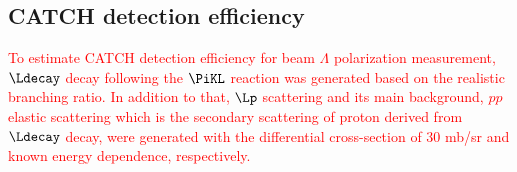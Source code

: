 \begin{comment}
\subsubsection{BGO energy measurement efficiency }
The efficiency was estimated by checking whether or not the measured energy by BGO was consistent with the predicted energy from the pp scattering kinematics, using the $pp$ elastic scattering data the same way as in the study of CFT tracking efficiency. Figure \ref{fig-BGOeff}  shows the momentum dependence of the
BGO efficiency for protons emitted at $\theta_{lab}=41^{\circ}$ where the crossed line represents the simulation result and the red circle represents the result of $pp$ elastic scattering data. Regarding BGO energy measurement efficiency, consistency between data and simulations was confirmed in all angular regions. Therefore, the simulated efficiency was used as the efficiency map, as shown in Figure \ref{fig-BGOeffmap}. For more details, refer to Ref. \cite{Miwa-SMp}.

\begin{figure}[!h]
  \begin{minipage}[t]{0.48\columnwidth}
    \centering
    \texttt{[image: BGOeff.png]}
    \caption{Momentum dependence of the BGO energy measurement for protons from the $pp$ elastic scattering data and the simulation data for a scattering angle of $\theta_{lab}=41^{\circ}$ \cite{Miwa-SMp}.}
    \label{fig-BGOeff}
  \end{minipage}
  \hspace{0.04\columnwidth} %
  \begin{minipage}[t]{0.48\columnwidth}
    \centering
    \texttt{[image: BGOeffmap.png]}
    \caption{Estimated BGO efficiency map as a function of the scattering angle and momentum of the proton \cite{Miwa-SMp}.}
    \label{fig-BGOeffmap}
  \end{minipage}
\end{figure}

\end{comment}


\subsection{CATCH detection efficiency}

\textcolor{red}{ To estimate CATCH detection efficiency for beam $\Lambda$ polarization measurement, $\Ldecay$ decay following the $\PiKL$ reaction was generated based on the realistic branching ratio. In addition to that, $\Lp$ scattering and its main background, $pp$ elastic scattering which is the secondary scattering of proton derived from $\Ldecay$ decay, were generated with the differential cross-section of 30 mb/sr and known energy dependence, respectively. }

